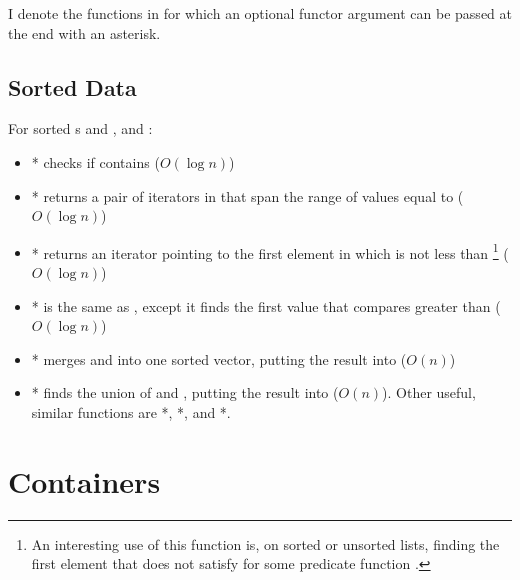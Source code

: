 \documentclass[../main]{subfiles}
\begin{document}

\par
I denote the functions in  for which an optional functor argument can be passed at the end with an asterisk.


\subsection{Sorted Data}

For sorted s  and , and :

\begin{itemize}
    \item * checks if  contains  ($O(\log n)$)
    \item * returns a pair of iterators in  that span the range of values equal to  ($O(\log n)$)
    \item * returns an iterator pointing to the first element in  which is not less than  \footnote{An interesting use of this function is, on sorted or unsorted lists, finding the first element  that does not satisfy  for some predicate function . } ($O(\log n)$)
    \item * is the same as , except it finds the first value that compares greater than  ($O(\log n)$)
    \item * merges  and  into one sorted vector, putting the result into  ($O(n)$)
    \item * finds the union of  and , putting the result into  ($O(n)$). Other useful, similar functions are *, *, and *.
\end{itemize}



\section{Containers}
\end{document}
